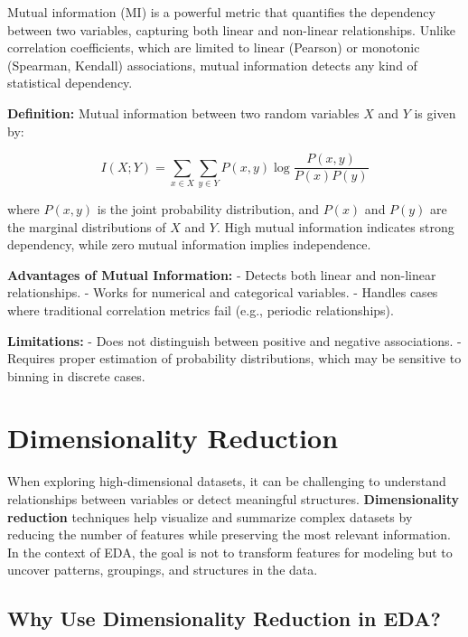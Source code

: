 \documentclass[12pt,openany]{book}
\begin{document}
Mutual information (MI) is a powerful metric that quantifies the dependency between two variables, capturing both linear and non-linear relationships. Unlike correlation coefficients, which are limited to linear (Pearson) or monotonic (Spearman, Kendall) associations, mutual information detects any kind of statistical dependency.
\newline

\textbf{Definition:}
Mutual information between two random variables \( X \) and \( Y \) is given by:

\[
I(X; Y) = \sum_{x \in X} \sum_{y \in Y} P(x, y) \log \frac{P(x, y)}{P(x) P(y)}
\]

where \( P(x, y) \) is the joint probability distribution, and \( P(x) \) and \( P(y) \) are the marginal distributions of \( X \) and \( Y \). High mutual information indicates strong dependency, while zero mutual information implies independence.
\newline

\textbf{Advantages of Mutual Information:}
- Detects both linear and non-linear relationships.
- Works for numerical and categorical variables.
- Handles cases where traditional correlation metrics fail (e.g., periodic relationships).
\newline

\textbf{Limitations:}
- Does not distinguish between positive and negative associations.
- Requires proper estimation of probability distributions, which may be sensitive to binning in discrete cases.
\newline




\section{Dimensionality Reduction}

When exploring high-dimensional datasets, it can be challenging to understand relationships between variables or detect meaningful structures. \textbf{Dimensionality reduction} techniques help visualize and summarize complex datasets by reducing the number of features while preserving the most relevant information. In the context of EDA, the goal is not to transform features for modeling but to uncover patterns, groupings, and structures in the data.

\subsection{Why Use Dimensionality Reduction in EDA?}
\end{document}
